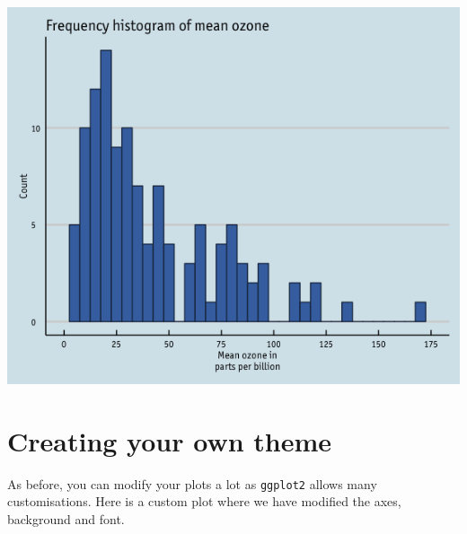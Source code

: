 \begin{center}\includegraphics[width=0.55\linewidth]{0_all_posts_pdf/histogram_15-1} \end{center}

\section{Creating your own theme}\label{creating-your-own-theme-6}

As before, you can modify your plots a lot as \texttt{ggplot2} allows
many customisations. Here is a custom plot where we have modified the
axes, background and font.

